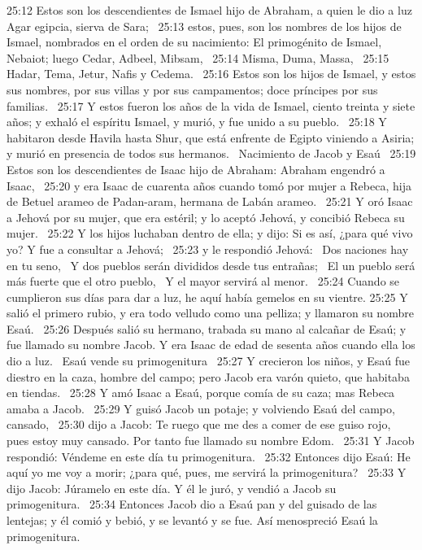 25:12 Estos son los descendientes de Ismael hijo de Abraham, a quien le dio a luz Agar egipcia, sierva de Sara;  
25:13 estos, pues, son los nombres de los hijos de Ismael, nombrados en el orden de su nacimiento: El primogénito de Ismael, Nebaiot; luego Cedar, Adbeel, Mibsam,  
25:14 Misma, Duma, Massa,  
25:15 Hadar, Tema, Jetur, Nafis y Cedema.  
25:16 Estos son los hijos de Ismael, y estos sus nombres, por sus villas y por sus campamentos; doce príncipes por sus familias.  
25:17 Y estos fueron los años de la vida de Ismael, ciento treinta y siete años; y exhaló el espíritu Ismael, y murió, y fue unido a su pueblo.  
25:18 Y habitaron desde Havila hasta Shur, que está enfrente de Egipto viniendo a Asiria; y murió en presencia de todos sus hermanos.  
Nacimiento de Jacob y Esaú  
25:19 Estos son los descendientes de Isaac hijo de Abraham: Abraham engendró a Isaac,  
25:20 y era Isaac de cuarenta años cuando tomó por mujer a Rebeca, hija de Betuel arameo de Padan-aram, hermana de Labán arameo.  
25:21 Y oró Isaac a Jehová por su mujer, que era estéril; y lo aceptó Jehová, y concibió Rebeca su mujer.  
25:22 Y los hijos luchaban dentro de ella; y dijo: Si es así, ¿para qué vivo yo? Y fue a consultar a Jehová;  
25:23 y le respondió Jehová:  
Dos naciones hay en tu seno,  
Y dos pueblos serán divididos desde tus entrañas;  
El un pueblo será más fuerte que el otro pueblo,  
Y el mayor servirá al menor.  
25:24 Cuando se cumplieron sus días para dar a luz, he aquí había gemelos en su vientre. 
25:25 Y salió el primero rubio, y era todo velludo como una pelliza; y llamaron su nombre Esaú.  
25:26 Después salió su hermano, trabada su mano al calcañar de Esaú; y fue llamado su nombre Jacob. Y era Isaac de edad de sesenta años cuando ella los dio a luz.  
Esaú vende su primogenitura  
25:27 Y crecieron los niños, y Esaú fue diestro en la caza, hombre del campo; pero Jacob era varón quieto, que habitaba en tiendas.  
25:28 Y amó Isaac a Esaú, porque comía de su caza; mas Rebeca amaba a Jacob.  
25:29 Y guisó Jacob un potaje; y volviendo Esaú del campo, cansado,  
25:30 dijo a Jacob: Te ruego que me des a comer de ese guiso rojo, pues estoy muy cansado. Por tanto fue llamado su nombre Edom.  
25:31 Y Jacob respondió: Véndeme en este día tu primogenitura.  
25:32 Entonces dijo Esaú: He aquí yo me voy a morir; ¿para qué, pues, me servirá la primogenitura?  
25:33 Y dijo Jacob: Júramelo en este día. Y él le juró, y vendió a Jacob su primogenitura.  
25:34 Entonces Jacob dio a Esaú pan y del guisado de las lentejas; y él comió y bebió, y se levantó y se fue. Así menospreció Esaú la primogenitura.  

